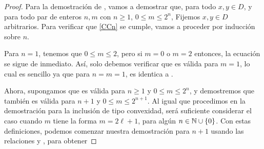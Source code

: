 \begin{proof}
	Para la demostraci\'on de , vamos a demostrar que, para todo $x,y\in D$,
	y para todo par de enteros $n,m$ con $n\geq 1$, $0\leq m\leq 2^n$,
	Fijemos $x,y\in D$ arbitrarios. Para verificar que \eqref{CCn} se cumple,
	vamos a proceder por inducci\'on sobre $n$. 
	
	Para $n=1$, tenemos que $0\leq m\leq 2$, pero si $m=0$ o $m=2$ entonces, 
	la ecuaci\'on  se sigue de inmediato. As\'i, solo debemos verificar
	que  es v\'alida para $m=1$, lo cual es sencillo ya que para 
	$n=m=1$,  es identica a . 
	
	Ahora, supongamos que  es v\'alida para $n\geq1$ y $0\leq m \leq 2^n$,
	y demostremos que tambi\'en es v\'alida para $n+1$ y $0\leq m\leq 2^{n+1}$.
	Al igual que procedimos en la demostraci\'on para la inclusi\'on de tipo 
	convexidad, ser\'a suficiente considerar el caso cuando $m$ tiene la forma
	$m = 2\ell + 1$, para alg\'un $n\in\mathbb{N}\cup\{0\}$. Con estas definiciones, 
	podemos comenzar nuestra demostraci\'on para $n+1$ usando las relaciones 
	 y , para obtener
	
	

\end{proof}
